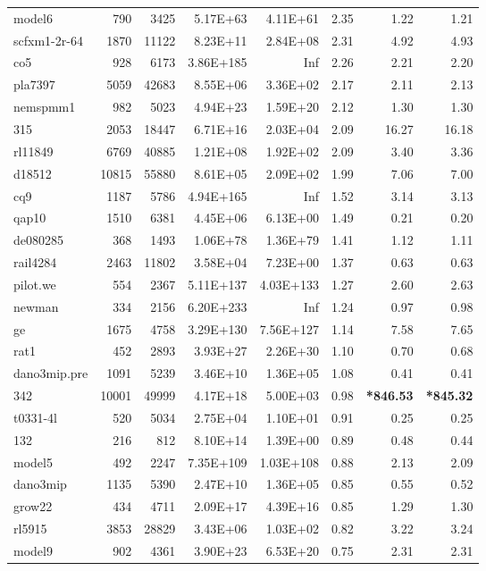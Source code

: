 \documentclass[10pt]{article}
\newcommand{\red}{
	\color{red}	
	}
\begin{document}
\begin{longtable}{|l|r|r|r|r|r|r|r|}
model6	&	790	&	3425	&	5.17E+63	&	4.11E+61	&	2.35	&	1.22	&	1.21	\\
scfxm1-2r-64	&	1870	&	11122	&	8.23E+11	&	2.84E+08	&	2.31	&	4.92	&	4.93	\\
co5	&	928	&	6173	&	3.86E+185	&	Inf	&	2.26	&	2.21	&	2.20	\\
pla7397	&	5059	&	42683	&	8.55E+06	&	3.36E+02	&	2.17	&	2.11	&	2.13	\\
nemspmm1	&	982	&	5023	&	4.94E+23	&	1.59E+20	&	2.12	&	1.30	&	1.30	\\
315	&	2053	&	18447	&	6.71E+16	&	2.03E+04	&	2.09	&	16.27	&	16.18	\\
rl11849	&	6769	&	40885	&	1.21E+08	&	1.92E+02	&	2.09	&	3.40	&	3.36	\\
d18512	&	10815	&	55880	&	8.61E+05	&	2.09E+02	&	1.99	&	7.06	&	7.00	\\
cq9	&	1187	&	5786	&	4.94E+165	&	Inf	&	1.52	&	3.14	&	3.13	\\
qap10	&	1510	&	6381	&	4.45E+06	&	6.13E+00	&	1.49	&	0.21	&	0.20	\\
de080285	&	368	&	1493	&	1.06E+78	&	1.36E+79	&	1.41	&	1.12	&	1.11	\\
rail4284	&	2463	&	11802	&	3.58E+04	&	7.23E+00	&	1.37	&	0.63	&	0.63	\\
pilot.we	&	554	&	2367	&	5.11E+137	&	4.03E+133	&	1.27	&	2.60	&	2.63	\\
newman	&	334	&	2156	&	6.20E+233	&	Inf	&	1.24	&	0.97	&	0.98	\\
ge	&	1675	&	4758	&	3.29E+130	&	7.56E+127	&	1.14	&	7.58	&	7.65	\\
rat1	&	452	&	2893	&	3.93E+27	&	2.26E+30	&	1.10	&	0.70	&	0.68	\\
dano3mip.pre	&	1091	&	5239	&	3.46E+10	&	1.36E+05	&	1.08	&	0.41	&	0.41	\\
342	&	10001	&	49999	&	4.17E+18	&	5.00E+03	&	0.98	&	{\bf \red *846.53} 	&	{\bf \red *845.32}	\\
t0331-4l	&	520	&	5034	&	2.75E+04	&	1.10E+01	&	0.91	&	0.25	&	0.25	\\
132	&	216	&	812	&	8.10E+14	&	1.39E+00	&	0.89	&	0.48	&	0.44	\\
model5	&	492	&	2247	&	7.35E+109	&	1.03E+108	&	0.88	&	2.13	&	2.09	\\
dano3mip	&	1135	&	5390	&	2.47E+10	&	1.36E+05	&	0.85	&	0.55	&	0.52	\\
grow22	&	434	&	4711	&	2.09E+17	&	4.39E+16	&	0.85	&	1.29	&	1.30	\\
rl5915	&	3853	&	28829	&	3.43E+06	&	1.03E+02	&	0.82	&	3.22	&	3.24	\\
model9	&	902	&	4361	&	3.90E+23	&	6.53E+20	&	0.75	&	2.31	&	2.31	\\

\end{longtable}
\end{document}
